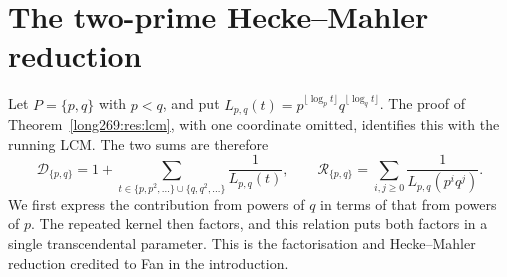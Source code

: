 \documentclass[11pt]{article}
\theoremstyle{remark}
\theoremstyle{plain}
\begin{document}
\section{The two-prime Hecke--Mahler reduction}
\label{long269:sec:two-prime}

Let $P=\{p,q\}$ with $p<q$, and put
$L_{p,q}(t)=p^{\lfloor\log_p t\rfloor}q^{\lfloor\log_q t\rfloor}$.
The proof of Theorem~\ref{long269:res:lcm}, with one coordinate omitted,
identifies this with the running LCM. The two sums are therefore
\[
 \mathcal D_{\{p,q\}}
 =1+\sum_{t\in\{p,p^2,\ldots\}\cup\{q,q^2,\ldots\}}\frac1{L_{p,q}(t)},
 \qquad
 \mathcal R_{\{p,q\}}=\sum_{i,j\ge0}\frac1{L_{p,q}(p^iq^j)}.
\]
We first express the contribution from powers of $q$ in terms of that
from powers of $p$. The repeated kernel then factors, and this relation
puts both factors in a single transcendental parameter. This is the
factorisation and Hecke--Mahler reduction credited to Fan in the introduction.
\end{document}
